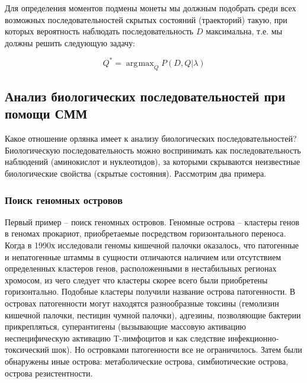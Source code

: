 \documentclass[letterpaper, 11pt]{article}
\DeclareMathOperator*{\argmax}{\arg\!\max}
\begin{document}
Для определения моментов подмены монеты мы должным подобрать среди всех возможных последовательностей скрытых состояний (траекторий) такую, при которых вероятность наблюдать последовательность $D$ максимальна, т.е. мы должны решить следующую задачу:

$$Q^*=\argmax_Q P(D,Q|\lambda)$$

\subsection{Анализ биологических последовательностей при помощи СММ}

Какое отношение орлянка имеет к анализу биологических последовательностей? Биологическую последовательность можно воспринимать как последовательность наблюдений (аминокислот и нуклеотидов), за которыми скрываются неизвестные биологические свойства (скрытые состояния). Рассмотрим два примера. 

\subsubsection{Поиск геномных островов}

Первый пример -- поиск геномных островов. Геномные острова -- кластеры генов в геномах прокариот, приобретаемые посредством горизонтального переноса. Когда в 1990х исследовали геномы кишечной палочки оказалось, что патогенные и непатогенные штаммы в сущности отличаются наличием или отсутствием определенных кластеров генов, расположенными в нестабильных регионах хромосом, из чего следует что кластеры скорее всего были приобретены горизонтально. Подобные кластеры получили название острова патогенности. В островах патогенности могут находятся разнообразные токсины (гемолизин кишечной палочки, пестицин чумной палочки), адгезины, позволяющие бактерии прикрепляться, суперантигены (вызывающие массовую активацию неспецифическую активацию T-лимфоцитов и как следствие инфекционно-токсический шок). Но островками патогенности все не ограничилось. Затем были обнаружены иные острова: метаболические острова, симбиотические острова, острова резистентности.
\end{document}
